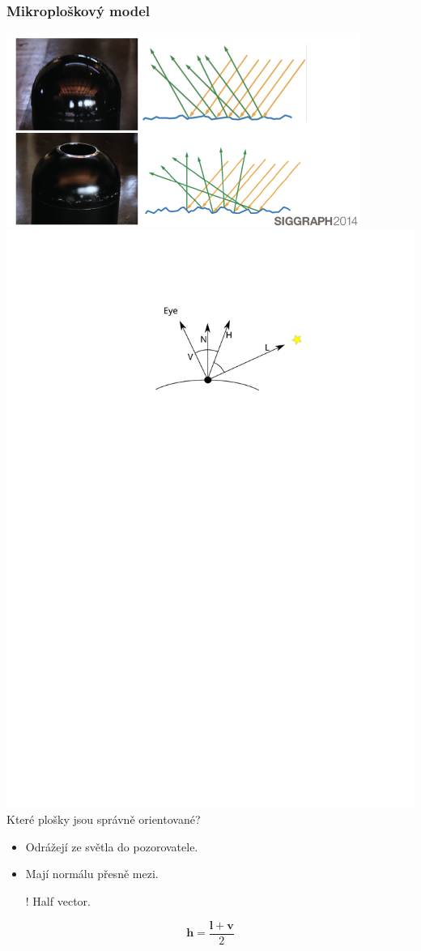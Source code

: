 \begin{frame}
    \frametitle{Mikroploškový model}
    \includegraphics[width=.5\textwidth]{pics/physicallyBasedRendering/mf}
    \includegraphics[width=.5\textwidth]{pics/physicallyBasedRendering/half}\\
    Které plošky jsou správně orientované?
    \pause
    \begin{itemize}
        \item Odrážejí ze světla do pozorovatele.
        \item Mají normálu přesně mezi.
        \item[!] Half vector.
    \end{itemize}
    \begin{equation*}
        \mathbf h = \frac{\mathbf l + \mathbf v}{2}
    \end{equation*}
\end{frame}

